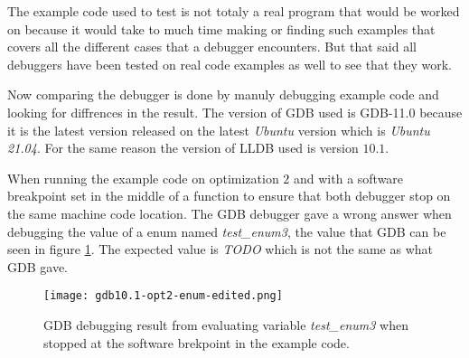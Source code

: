 
The example code used to test is not totaly a real program that would be worked on because it would take to much time making or finding such examples that covers all the different cases that a debugger encounters.
But that said all debuggers have been tested on real code examples as well to see that they work.


Now comparing the debugger is done by manuly debugging example code \cite{debugexample} and looking for diffrences in the result.
The version of \gls{GDB} used is \gls{GDB}-11.0 because it is the latest version released on the latest \emph{Ubuntu} version which is \emph{Ubuntu 21.04}.
For the same reason the version of \gls{LLDB} used is version $10.1$.


When running the example code on optimization $2$ and with a software breakpoint set in the middle of a function to ensure that both debugger stop on the same machine code location.
The \gls{GDB} debugger gave a wrong answer when debugging the value of a enum named \emph{test\_enum3}, the value that \gls{GDB} can be seen in figure \ref{fig:gdbenum}.
The expected value is \emph{TODO} which is not the same as what \gls{GDB} gave.


\begin{figure}[h]
	\centering
	\texttt{[image: gdb10.1-opt2-enum-edited.png]}
	\caption{\gls{GDB} debugging result from evaluating variable \emph{test\_enum3} when stopped at the software brekpoint in the example code.}
	\label{fig:gdbenum}
\end{figure}


